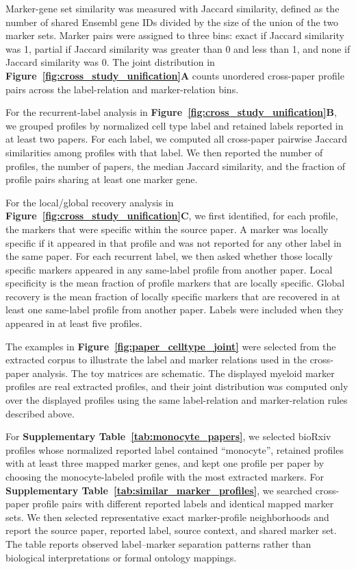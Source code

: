 \documentclass[10pt,twocolumn]{article}
\theoremstyle{plain}
\theoremstyle{definition}
\theoremstyle{remark}
\begin{document}
Marker-gene set similarity was measured with Jaccard similarity, defined as the number of shared Ensembl gene IDs divided by the size of the union of the two marker sets. Marker pairs were assigned to three bins: exact if Jaccard similarity was 1, partial if Jaccard similarity was greater than 0 and less than 1, and none if Jaccard similarity was 0. The joint distribution in \textbf{Figure~\ref{fig:cross_study_unification}A} counts unordered cross-paper profile pairs across the label-relation and marker-relation bins.

For the recurrent-label analysis in \textbf{Figure~\ref{fig:cross_study_unification}B}, we grouped profiles by normalized cell type label and retained labels reported in at least two papers. For each label, we computed all cross-paper pairwise Jaccard similarities among profiles with that label. We then reported the number of profiles, the number of papers, the median Jaccard similarity, and the fraction of profile pairs sharing at least one marker gene.

For the local/global recovery analysis in \textbf{Figure~\ref{fig:cross_study_unification}C}, we first identified, for each profile, the markers that were specific within the source paper. A marker was locally specific if it appeared in that profile and was not reported for any other label in the same paper. For each recurrent label, we then asked whether those locally specific markers appeared in any same-label profile from another paper. Local specificity is the mean fraction of profile markers that are locally specific. Global recovery is the mean fraction of locally specific markers that are recovered in at least one same-label profile from another paper. Labels were included when they appeared in at least five profiles.

The examples in \textbf{Figure~\ref{fig:paper_celltype_joint}} were selected from the extracted corpus to illustrate the label and marker relations used in the cross-paper analysis. The toy matrices are schematic. The displayed myeloid marker profiles are real extracted profiles, and their joint distribution was computed only over the displayed profiles using the same label-relation and marker-relation rules described above.

For \textbf{Supplementary Table~\ref{tab:monocyte_papers}}, we selected bioRxiv profiles whose normalized reported label contained ``monocyte'', retained profiles with at least three mapped marker genes, and kept one profile per paper by choosing the monocyte-labeled profile with the most extracted markers. For \textbf{Supplementary Table~\ref{tab:similar_marker_profiles}}, we searched cross-paper profile pairs with different reported labels and identical mapped marker sets. We then selected representative exact marker-profile neighborhoods and report the source paper, reported label, source context, and shared marker set. The table reports observed label--marker separation patterns rather than biological interpretations or formal ontology mappings.
\end{document}
